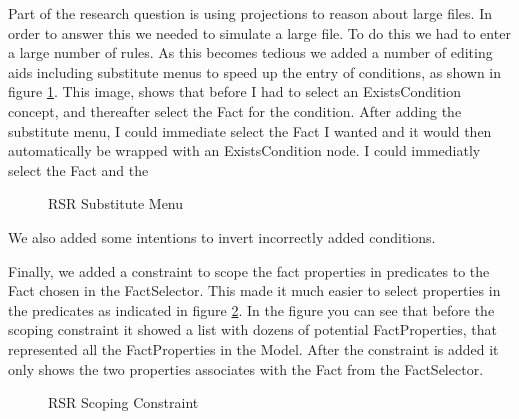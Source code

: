 Part of the research question is using projections to reason about large files.
In order to answer this we needed to simulate a large file.
To do this we had to enter a large number of rules.
As this becomes tedious we added a number of editing aids including substitute menus to speed up the entry of conditions, as shown in figure \ref{fig:RSRSubstituteMenu}.
This image, shows that before I had to select an ExistsCondition concept, and thereafter select the Fact for the condition.
After adding the substitute menu, I could immediate select the Fact I wanted and it would then automatically be wrapped with an ExistsCondition node.
I could immediatly select the Fact and the 

\begin{figure}[h]
    \centering
    \caption{RSR Substitute Menu}
    \label{fig:RSRSubstituteMenu}
\end{figure}

We also added some intentions to invert incorrectly added conditions.

Finally, we added a constraint to scope the fact properties in predicates to the Fact chosen in the FactSelector.
This made it much easier to select properties in the predicates as indicated in figure \ref{fig:RSRConstraint}.
In the figure you can see that before the scoping constraint it showed a list with dozens of potential FactProperties, that represented all the FactProperties in the Model.
After the constraint is added it only shows the two properties associates with the Fact from the FactSelector.

\begin{figure}[h]
    \centering
    \caption{RSR Scoping Constraint}
    \label{fig:RSRConstraint}
\end{figure}

